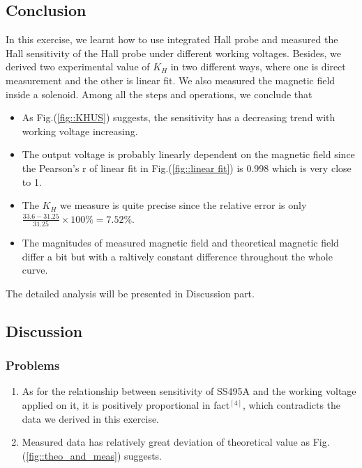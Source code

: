 \documentclass[a4paper]{article}
\begin{document}
\subsection{Conclusion}

In this exercise, we learnt how to use integrated Hall probe and measured the Hall sensitivity of the Hall probe under different working voltages.
Besides, we derived two experimental value of $K_H$ in two different ways, where one is direct measurement and the other is linear fit.
We also measured the magnetic field inside a solenoid. Among all the steps and operations, we conclude that
\begin{itemize}
	\item As Fig.(\ref{fig::KHUS}) suggests, the sensitivity has a decreasing trend with working voltage increasing.
	\item The output voltage is probably linearly dependent on the magnetic field since the Pearson's r of linear fit
	      in Fig.(\ref{fig::linear fit}) is 0.998 which is very close to 1.
	\item The $K_H$ we measure is quite precise since the relative error is only $\frac{33.6-31.25}{31.25}\times 100\% = 7.52\%$.
	\item The magnitudes of measured magnetic field and theoretical magnetic field differ a bit but with a raltively constant difference throughout
	      the whole curve.
\end{itemize}
\par The detailed analysis will be presented in Discussion part.

\subsection{Discussion}

\subsubsection{Problems}
\begin{enumerate}[1.]
	\item As for the relationship between sensitivity of SS495A and the working voltage applied on it, it is
	      positively proportional in fact$^{[4]}$, which contradicts the data we derived in this exercise.
	\item Measured data has relatively great deviation of theoretical value as Fig.(\ref{fig::theo_and_meas})
	      suggests.
\end{enumerate}
\end{document}
